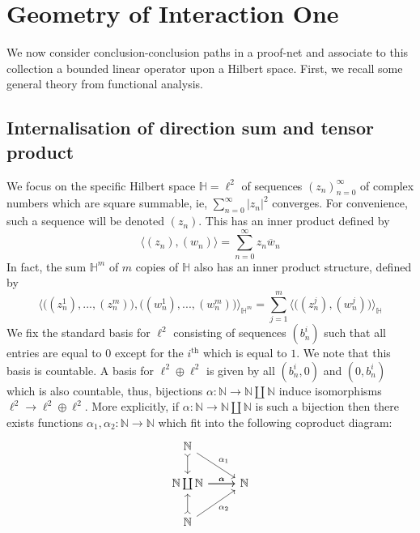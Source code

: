 \documentclass[12pt]{article}
\theoremstyle{plain}
\theoremstyle{definition}
\newcommand{\bb}[1]{\mathbb{#1}}
\newcommand{\lto}{\longrightarrow}
\begin{document}
\section{Geometry of Interaction One}
We now consider conclusion-conclusion paths in a proof-net and associate to this collection a bounded linear operator upon a Hilbert space. First, we recall some general theory from functional analysis.
\subsection{Internalisation of direction sum and tensor product}\label{sec:interal_sum_tens}
We focus on the specific Hilbert space $\bb{H} = \ell^2$ of sequences $(z_n)_{n = 0}^\infty$ of complex numbers which are square summable, ie, $\sum_{n = 0}^\infty |z_n|^2$ converges. For convenience, such a sequence will be denoted $(z_n)$. This has an inner product defined by
\begin{equation}
    \big\langle (z_n), (w_n)\big\rangle = \sum_{n = 0}^\infty z_n\overline{w}_n
\end{equation}
In fact, the sum $\bb{H}^m$ of $m$ copies of $\bb{H}$ also has an inner product structure, defined by
\begin{equation}\label{eq:bijection}
    \Big\langle \big((z_n^1),...,(z_n^m)\big),\big((w_n^1),...,(w_n^m)\big)\Big\rangle_{\bb{H}^m} = \sum_{j = 1}^m\Big\langle \big((z_n^j),(w_n^j)\big)\Big\rangle_{\bb{H}}
\end{equation}
We fix the standard basis for $\ell^2$ consisting of sequences $(b^i_n)$ such that all entries are equal to $0$ except for the $i^{\operatorname{th}}$ which is equal to $1$. We note that this basis is countable. A basis for $\ell^2 \oplus \ell^2$ is given by all $(b^i_n, 0)$ and $(0,b_n^i)$ which is also countable, thus, bijections $\alpha: \bb{N} \lto \bb{N} \coprod \bb{N}$ induce isomorphisms $\ell^2 \lto \ell^2 \oplus \ell^2$. More explicitly, if $\alpha: \bb{N} \lto \bb{N} \coprod \bb{N}$ is such a bijection then there exists functions $\alpha_1,\alpha_2: \bb{N} \lto \bb{N}$ which fit into the following coproduct diagram:
\begin{equation}
    \begin{tikzcd}
    \bb{N}\arrow[dr,"{\alpha_1}"]\arrow[d,rightarrowtail]\\
    \bb{N}\arrow[r,"{\alpha}"] \coprod \bb{N}\arrow[r,"{\alpha}"] & \bb{N}\\
    \bb{N}\arrow[ur,swap,"{\alpha_2}"]\arrow[u,rightarrowtail]
    \end{tikzcd}
\end{equation}
\end{document}
